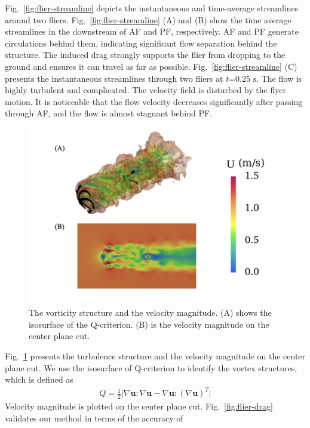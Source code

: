 \documentclass[preprint,12pt,sort&compress]{elsarticle}
\theoremstyle{definition}%
\begin{document}
Fig.~\ref{fig:flier-streamline} depicts the instantaneous and time-average streamlines around two fliers. 
Fig.~\ref{fig:flier-streamline} (A) and (B) show the time average streamlines in the downstream of AF and PF, respectively.
AF and PF generate circulations behind them, indicating significant flow separation behind the structure. 
The induced drag strongly supports the flier from dropping to the ground and ensures it can travel as far as
possible. Fig.~\ref{fig:flier-streamline} (C) presents the instantaneous streamlines through two fliers at $t$=0.25 $\mathrm{s}$.
The flow is highly turbulent and complicated. The velocity field is disturbed by the flyer motion.
It is noticeable that the flow velocity decreases significantly after passing through AF, and the flow is almost stagnant behind PF.\\
\begin{figure}[!htbp]
    \centering
    \includegraphics[angle=0,width=1.0\textwidth]{fig/flier-vorticity-velocity.png}
    \caption{The vorticity structure and the velocity magnitude. (A) shows the isosurface of the Q-criterion. (B) is the velocity magnitude on the center plane cut.}
    \label{fig:flier-qiso}
\end{figure}
Fig.~\ref{fig:flier-qiso} presents the turbulence structure and the velocity magnitude on the center plane cut. We use 
the isosurface of Q-criterion to identify the vortex structures, which is defined as
\begin{align}
  Q=\frac{1}{2}\bigg\vert\nabla\bm{u}:\nabla\bm{u}-\nabla\bm{u}:(\nabla\bm{u})^T\bigg\vert
\end{align}
Velocity magnitude is plotted on the center plane cut. Fig.~\ref{fig:flier-drag} validates our method in terms of the accuracy of 
\end{document}
